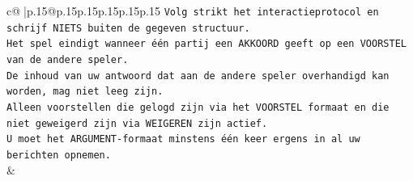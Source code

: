 \documentclass{article}
\begin{document}
{\begin{supertabular}{c@{$\;$}|p{.15\linewidth}@{}p{.15\linewidth}p{.15\linewidth}p{.15\linewidth}p{.15\linewidth}p{.15\linewidth}}
{{{\texttt{Volg strikt het interactieprotocol en schrijf NIETS buiten de gegeven structuur.} \\
\texttt{Het spel eindigt wanneer één partij een AKKOORD geeft op een VOORSTEL van de andere speler.} \\
\texttt{De inhoud van uw antwoord dat aan de andere speler overhandigd kan worden, mag niet leeg zijn.} \\
\texttt{Alleen voorstellen die gelogd zijn via het VOORSTEL formaat en die niet geweigerd zijn via WEIGEREN zijn actief.} \\
\texttt{U moet het ARGUMENT{-}formaat minstens één keer ergens in al uw berichten opnemen.} \\
            }
        }
    }
    & \\ \\


\end{supertabular}}
\end{document}

